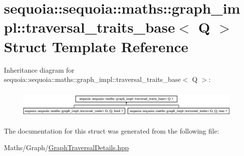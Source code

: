 \hypertarget{structsequoia_1_1sequoia_1_1maths_1_1graph__impl_1_1traversal__traits__base}{}\section{sequoia\+::sequoia\+::maths\+::graph\+\_\+impl\+::traversal\+\_\+traits\+\_\+base$<$ Q $>$ Struct Template Reference}
\label{structsequoia_1_1sequoia_1_1maths_1_1graph__impl_1_1traversal__traits__base}
Inheritance diagram for sequoia\+::sequoia\+::maths\+::graph\+\_\+impl\+::traversal\+\_\+traits\+\_\+base$<$ Q $>$\+:\begin{figure}[H]
\begin{center}
\leavevmode
\includegraphics[height=1.424936cm]{structsequoia_1_1sequoia_1_1maths_1_1graph__impl_1_1traversal__traits__base}
\end{center}
\end{figure}


The documentation for this struct was generated from the following file\+:\begin{DoxyCompactItemize}
\item 
Maths/\+Graph/\mbox{\hyperlink{_graph_traversal_details_8hpp}{Graph\+Traversal\+Details.\+hpp}}\end{DoxyCompactItemize}

